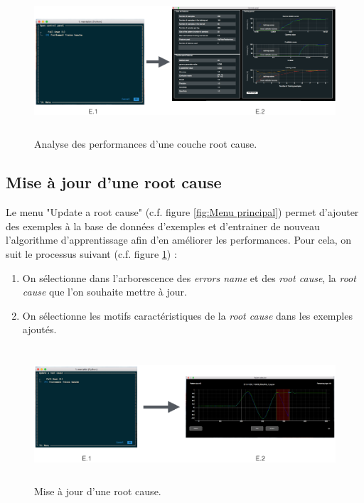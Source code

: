 \begin{figure}[H]
	\centering\includegraphics[height=5.5cm]{images/perf_menu.png}
	\caption[Analyse des performances d'une couche root cause]{Analyse des performances d'une couche root cause.}
	\label{fig: Analyse des performances d'une couche root cause}
\end{figure} 


\subsection{Mise à jour d'une root cause}
\label{Industrialisation du produit: Utilisation suggérée des outils: Mise à jour d'une root cause}
Le menu "Update a root cause"  (c.f. figure \ref{fig:Menu principal}) permet d'ajouter des exemples à la base de données d'exemples et d'entrainer de nouveau l'algorithme d'apprentissage afin d'en améliorer les performances. Pour cela, on suit le processus suivant (c.f. figure \ref{fig: Analyse des performances d'une couche root cause}) : 
\begin{enumerate}
	\item On sélectionne dans l'arborescence des \emph{errors name} et des \emph{root cause}, la \emph{root cause} que l'on souhaite mettre à jour.
	\item On sélectionne les motifs caractéristiques de la \emph{root cause} dans les exemples ajoutés.
\end{enumerate}

\begin{figure}[H]
	\centering\includegraphics[height=5cm]{images/update_menu.png}
	\caption[Mise à jour d'une root cause]{Mise à jour d'une root cause.}
	\label{fig: Mise à jour d'une root cause}
\end{figure} 


